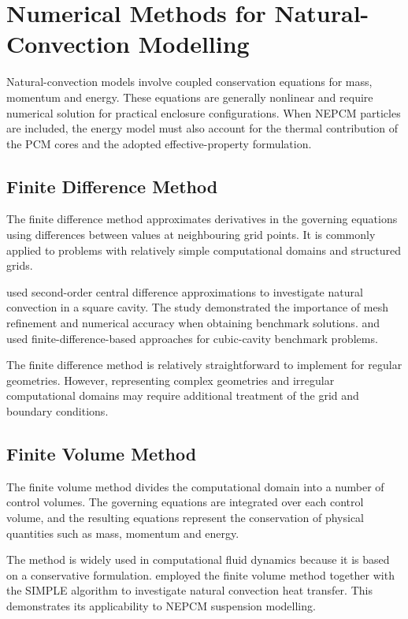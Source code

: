 \section{Numerical Methods for Natural-Convection Modelling}

Natural-convection models involve coupled conservation equations for mass, momentum and energy. These equations are generally nonlinear and require numerical solution for practical enclosure configurations. When NEPCM particles are included, the energy model must also account for the thermal contribution of the PCM cores and the adopted effective-property formulation.

\subsection{Finite Difference Method}

The finite difference method approximates derivatives in the governing equations using differences between values at neighbouring grid points. It is commonly applied to problems with relatively simple computational domains and structured grids.

\citet{devahldavis1983} used second-order central difference approximations to investigate natural convection in a square cavity. The study demonstrated the importance of mesh refinement and numerical accuracy when obtaining benchmark solutions. \citet{fusegi1991} and \citet{bennett2006} used finite-difference-based approaches for cubic-cavity benchmark problems.

The finite difference method is relatively straightforward to implement for regular geometries. However, representing complex geometries and irregular computational domains may require additional treatment of the grid and boundary conditions.

\subsection{Finite Volume Method}

The finite volume method divides the computational domain into a number of control volumes. The governing equations are integrated over each control volume, and the resulting equations represent the conservation of physical quantities such as mass, momentum and energy.

The method is widely used in computational fluid dynamics because it is based on a conservative formulation. \citet{golab2021} employed the finite volume method together with the SIMPLE algorithm to investigate natural convection heat transfer. This demonstrates its applicability to NEPCM suspension modelling.

